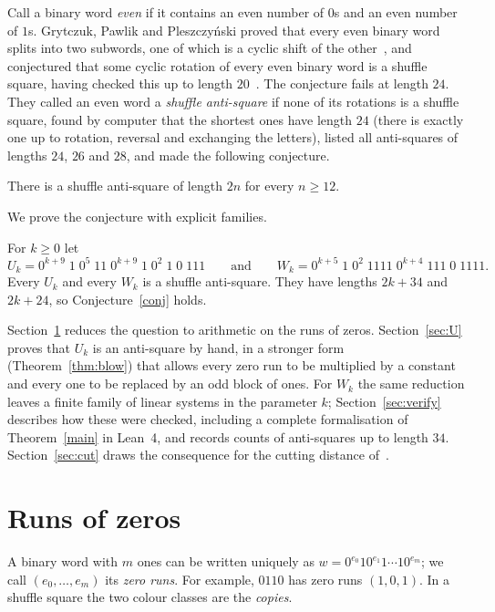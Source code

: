 \documentclass[12pt]{article}
\newcommand{\zz}[1]{0^{#1}}
\begin{document}
Call a binary word \emph{even} if it contains an even number of $0$s and an even number of $1$s. Grytczuk,
Pawlik and Pleszczy\'nski proved that every even binary word splits into two subwords, one of which is a cyclic
shift of the other~\cite[Theorem 2]{GPP}, and conjectured that some cyclic rotation of every even binary word
is a shuffle square, having checked this up to length $20$~\cite{GPP2}. The conjecture fails at length $24$. They called an even word a \emph{shuffle
anti-square} if none of its rotations is a shuffle square, found by computer that the shortest ones have length
$24$ (there is exactly one up to rotation, reversal and exchanging the letters), listed all anti-squares of
lengths $24$, $26$ and $28$, and made the following conjecture.

\begin{conjecture}\label{conj}
There is a shuffle anti-square of length $2n$ for every $n \ge 12$.
\end{conjecture}

We prove the conjecture with explicit families.

\begin{theorem}\label{main}
For $k \ge 0$ let
\[
U_k = \zz{k+9}\;1\;\zz{5}\;11\;\zz{k+9}\;1\;\zz{2}\;1\;0\;111
\qquad\text{and}\qquad
W_k = \zz{k+5}\;1\;\zz{2}\;1111\;\zz{k+4}\;111\;0\;1111 .
\]
Every $U_k$ and every $W_k$ is a shuffle anti-square. They have lengths $2k+34$ and $2k+24$, so
Conjecture~\ref{conj} holds.
\end{theorem}

Section~\ref{sec:runs} reduces the question to arithmetic on the runs of zeros. Section~\ref{sec:U} proves
that $U_k$ is an anti-square by hand, in a stronger form (Theorem~\ref{thm:blow}) that allows every zero
run to be multiplied by a constant and every one to be replaced by an odd block of ones. For $W_k$ the same reduction leaves a finite family of linear systems
in the parameter $k$; Section~\ref{sec:verify} describes how these were checked, including a complete
formalisation of Theorem~\ref{main} in Lean~4, and records counts of anti-squares up to length $34$.
Section~\ref{sec:cut} draws the consequence for the cutting distance of~\cite{GPP2}.

\section{Runs of zeros}\label{sec:runs}

A binary word with $m$ ones can be written uniquely as $w = \zz{e_0}1\zz{e_1}1\cdots1\zz{e_m}$; we call
$(e_0,\dots,e_m)$ its \emph{zero runs}. For example, $0110$ has zero runs $(1,0,1)$. In a shuffle square the two colour classes are the \emph{copies}.
\end{document}
